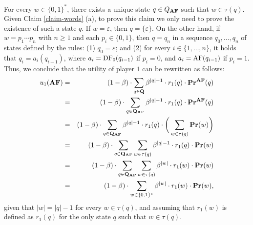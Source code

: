 For every $w \in \{0,1\}^*$, there exists a unique state $q \in Q_{\text{\rm {\bf AF}}}$ such that $w \in \tau(q)$. Given Claim \ref{claim-words} (a), to prove this claim we only need to prove the existence of such a state $q$. If $w = \varepsilon$, then $q = \{\varepsilon\}$. On the other hand, if $w = p_1 \cdots p_n$ with $n \geq 1$ and each $p_i \in \{0,1\}$, then $q = q_n$ in a sequence $q_0, \ldots, q_n$ of states defined by the rules: (1) $q_0 = \varepsilon$; and (2) for every $i \in \{1, \ldots, n\}$, it holds that $q_{i} = a_{i}(q_{i-1})$, where $a_{i} = \text{\rm DF}_0(q_{i-1})$ if $p_i = 0$, and $a_{i} = \text{\rm AF}(q_{i-1})$ if $p_i = 1$.
Thus, we conclude that the utility of player $1$ can be rewritten as follows:
\begin{eqnarray*}
u_1(\text{\rm {\bf AF}}) & = & (1-\beta)\cdot \sum_{q \in \mathbf{Q}} \beta^{|q|-1} \cdot  r_1(q) \cdot \mathbf{Pr}^{\text{\rm {\bf AF}}}(q)\\
& = & (1-\beta)\cdot\sum_{q \in \mathbf{Q}_{\text{\rm {\bf AF}}}} \beta^{|q|-1} \cdot  r_1(q) \cdot \mathbf{Pr}^{\text{\rm {\bf AF}}}(q)\\
& = & (1-\beta)\cdot\sum_{q \in \mathbf{Q}_{\text{\rm {\bf AF}}}} \beta^{|q|-1} \cdot  r_1(q) \cdot \bigg(\sum_{w \in \tau(q)} \mathbf{Pr}(w)\bigg)\\
& = &  (1-\beta)\cdot\sum_{q \in \mathbf{Q}_{\text{\rm {\bf AF}}}} \sum_{w \in \tau(q)} \beta^{|q|-1} \cdot  r_1(q) \cdot \mathbf{Pr}(w)\\
& = &  (1-\beta)\cdot\sum_{q \in \mathbf{Q}_{\text{\rm {\bf AF}}}} \sum_{w \in \tau(q)} \beta^{|w|} \cdot  r_1(w) \cdot \mathbf{Pr}(w)\\
& = & (1-\beta)\cdot\sum_{w \in \{0,1\}^*} \beta^{|w|} \cdot  r_1(w) \cdot \mathbf{Pr}(w),
\end{eqnarray*}
given that $|w| = |q| -1$ for every $w \in \tau(q)$, and assuming that $r_1(w)$ is defined as $r_1(q)$ for the only state $q$ such that $w \in \tau(q)$.








